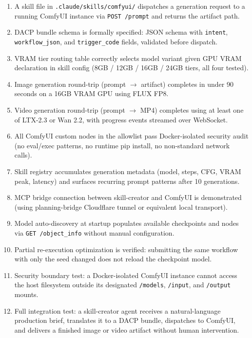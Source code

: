 \documentclass[11pt,letterpaper]{article}
\begin{document}
\begin{enumerate}
  \item A skill file in \texttt{.claude/skills/comfyui/} dispatches a generation request
  to a running ComfyUI instance via \texttt{POST /prompt} and returns the artifact path.

  \item DACP bundle schema is formally specified: JSON schema with \texttt{intent},
  \texttt{workflow\_json}, and \texttt{trigger\_code} fields, validated before dispatch.

  \item VRAM tier routing table correctly selects model variant given GPU VRAM
  declaration in skill config (8GB / 12GB / 16GB / 24GB tiers, all four tested).

  \item Image generation round-trip (prompt $\to$ artifact) completes in under
  90 seconds on a 16GB VRAM GPU using FLUX FP8.

  \item Video generation round-trip (prompt $\to$ MP4) completes using at least
  one of LTX-2.3 or Wan 2.2, with progress events streamed over WebSocket.

  \item All ComfyUI custom nodes in the allowlist pass Docker-isolated security
  audit (no eval/exec patterns, no runtime pip install, no non-standard network calls).

  \item Skill registry accumulates generation metadata (model, steps, CFG, VRAM peak,
  latency) and surfaces recurring prompt patterns after 10 generations.

  \item MCP bridge connection between skill-creator and ComfyUI is demonstrated
  (using planning-bridge Cloudflare tunnel or equivalent local transport).

  \item Model auto-discovery at startup populates available checkpoints and nodes
  via \texttt{GET /object\_info} without manual configuration.

  \item Partial re-execution optimization is verified: submitting the same workflow
  with only the seed changed does not reload the checkpoint model.

  \item Security boundary test: a Docker-isolated ComfyUI instance cannot access
  the host filesystem outside its designated \texttt{/models}, \texttt{/input},
  and \texttt{/output} mounts.

  \item Full integration test: a skill-creator agent receives a natural-language
  production brief, translates it to a DACP bundle, dispatches to ComfyUI, and
  delivers a finished image or video artifact without human intervention.
\end{enumerate}
\end{document}
